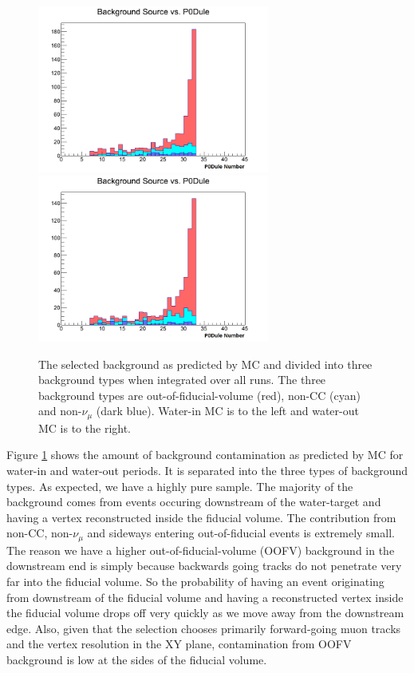 \begin{figure}[h]
\centering
\includegraphics[width=3in]{Figures/BGw.png}
\includegraphics[width=3in]{Figures/BGa.png}
\caption{The selected background as predicted by MC and divided into three background types when integrated over all runs. The three background types are out-of-fiducial-volume (red), non-CC (cyan) and non-$\nu_\mu$ (dark blue). Water-in MC is to the left and water-out MC is to the right.}
\label{fig:xsbg}
\end{figure}

Figure \ref{fig:xsbg} shows the amount of background contamination as predicted by MC for water-in and water-out periods. It is separated into the three types of background types. As expected, we have a highly pure sample. The majority of the background comes from events occuring downstream of the water-target and having a vertex reconstructed inside the fiducial volume. The contribution from non-CC, non-$\nu_\mu$ and sideways entering out-of-fiducial events is extremely small. The reason we have a higher out-of-fiducial-volume (OOFV) background in the downstream end is simply because backwards going tracks do not penetrate very far into the fiducial volume. So the probability of having an event originating from downstream of the fiducial volume and having a reconstructed vertex inside the fiducial volume drops off very quickly as we move away from the downstream edge. Also, given that the selection chooses primarily forward-going muon tracks and the vertex resolution in the XY plane, contamination from OOFV background is low at the sides of the fiducial volume.

